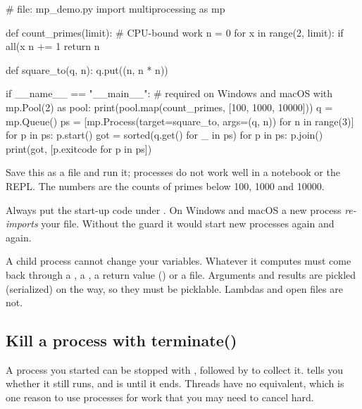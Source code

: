 \begin{pycode}
# file: mp_demo.py
import multiprocessing as mp


def count_primes(limit):                  # CPU-bound work
    n = 0
    for x in range(2, limit):
        if all(x %
            n += 1
    return n


def square_to(q, n):
    q.put((n, n * n))


if __name__ == "__main__":                # required on Windows and macOS
    with mp.Pool(2) as pool:
        print(pool.map(count_primes, [100, 1000, 10000]))
    q = mp.Queue()
    ps = [mp.Process(target=square_to, args=(q, n)) for n in range(3)]
    for p in ps:
        p.start()
    got = sorted(q.get() for _ in ps)
    for p in ps:
        p.join()
    print(got, [p.exitcode for p in ps])
\end{pycode}
\begin{rawcode}
[25, 168, 1229]
[(0, 0), (1, 1), (2, 4)] [0, 0, 0]
\end{rawcode}

Save this as a file and run it; processes do not work well in a notebook or the REPL.
The numbers are the counts of primes below 100, 1000 and 10000.

\begin{gamerule}
Always put the start-up code under . On Windows and macOS a
new process \emph{re-imports} your file. Without the guard it would start new processes again and
again.
\end{gamerule}

\begin{trap}
A child process cannot change your variables. Whatever it computes must come back through a
, a , a return value () or a file. Arguments and results
are pickled (serialized) on the way, so they must be picklable. Lambdas and open files are not.
\end{trap}

\subsection{Kill a process with terminate()}

A process you started can be stopped with , followed by  to
collect it.  tells you whether it still runs, and  is
 until it ends. Threads have no equivalent, which is one reason to use processes for
work that you may need to cancel hard.

